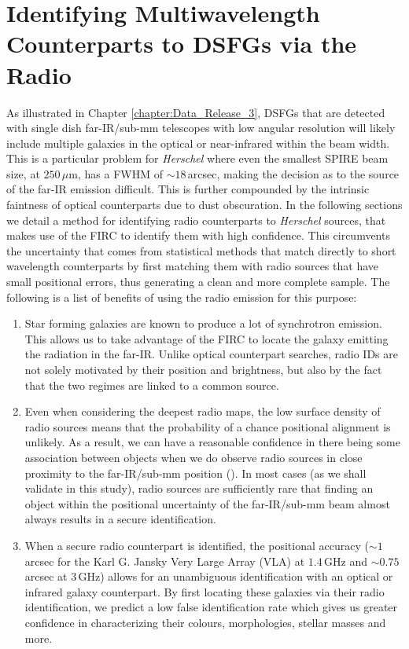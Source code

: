 \section{Identifying Multiwavelength Counterparts to DSFGs via the Radio}
\label{sec:identifying_multiwavelength_via_radio}

As illustrated in Chapter \ref{chapter:Data_Release_3}, DSFGs that are detected with single dish far-IR/sub-mm telescopes with low angular resolution will likely include multiple galaxies in the optical or near-infrared within the beam width. This is a particular problem for \textit{Herschel} where even the smallest SPIRE beam size, at $250\,\mu$m, has a FWHM of $\sim 18\,$arcsec, making the decision as to the source of the far-IR emission difficult. This is further compounded by the intrinsic faintness of optical counterparts due to dust obscuration. In the following sections we detail a method for identifying radio counterparts to \textit{Herschel} sources, that makes use of the FIRC to identify them with high confidence. This circumvents the uncertainty that comes from statistical methods that match directly to short wavelength counterparts by first matching them with radio sources that have small positional errors, thus generating a clean and more complete sample. The following is a list of benefits of using the radio emission for this purpose:

\begin{enumerate}
    \item Star forming galaxies are known to produce a lot of synchrotron emission. This allows us to take advantage of the FIRC to locate the galaxy emitting the radiation in the far-IR. Unlike optical counterpart searches, radio IDs are not solely motivated by their position and brightness, but also by the fact that the two regimes are linked to a common source.
    \item Even when considering the deepest radio maps, the low surface density of radio sources means that the probability of a chance positional alignment is unlikely. As a result, we can have a reasonable confidence in there being some association between objects when we do observe radio sources in close proximity to the far-IR/sub-mm position (\citealt{Ivison_2002, Borys_2004}). In most cases (as we shall validate in this study), radio sources are sufficiently rare that finding an object within the positional uncertainty of the far-IR/sub-mm beam almost always results in a secure identification.
    \item When a secure radio counterpart is identified, the positional accuracy ($\sim 1\,$arcsec for the Karl G. Jansky Very Large Array (VLA) at $1.4\,$GHz and $\sim 0.75\,$arcsec at $3\,$GHz) allows for an unambiguous identification with an optical or infrared galaxy counterpart. By first locating these galaxies via their radio identification, we predict a low false identification rate which gives us greater confidence in characterizing their colours, morphologies, stellar masses and more.
\end{enumerate}

